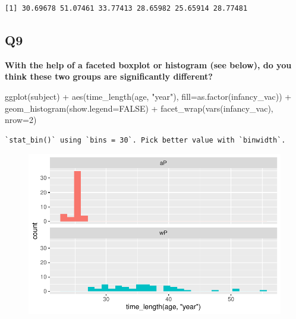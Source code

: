 \documentclass[
  letterpaper,
  DIV=11,
  numbers=noendperiod]{scrartcl}
\newenvironment{Shaded}{\begin{snugshade}}{\end{snugshade}}
\newcommand{\AttributeTok}[1]{\textcolor[rgb]{0.40,0.45,0.13}{#1}}
\newcommand{\ConstantTok}[1]{\textcolor[rgb]{0.56,0.35,0.01}{#1}}
\newcommand{\DecValTok}[1]{\textcolor[rgb]{0.68,0.00,0.00}{#1}}
\newcommand{\FunctionTok}[1]{\textcolor[rgb]{0.28,0.35,0.67}{#1}}
\newcommand{\NormalTok}[1]{\textcolor[rgb]{0.00,0.23,0.31}{#1}}
\newcommand{\SpecialCharTok}[1]{\textcolor[rgb]{0.37,0.37,0.37}{#1}}
\newcommand{\StringTok}[1]{\textcolor[rgb]{0.13,0.47,0.30}{#1}}
\begin{document}
\begin{verbatim}
[1] 30.69678 51.07461 33.77413 28.65982 25.65914 28.77481
\end{verbatim}

\hypertarget{q9}{%
\subsection{Q9}\label{q9}}

\textbf{With the help of a faceted boxplot or histogram (see below), do
you think these two groups are significantly different?}

\begin{Shaded}
\begin{Highlighting}[]
\FunctionTok{ggplot}\NormalTok{(subject) }\SpecialCharTok{+}
  \FunctionTok{aes}\NormalTok{(}\FunctionTok{time\_length}\NormalTok{(age, }\StringTok{"year"}\NormalTok{),}
      \AttributeTok{fill=}\FunctionTok{as.factor}\NormalTok{(infancy\_vac)) }\SpecialCharTok{+}
  \FunctionTok{geom\_histogram}\NormalTok{(}\AttributeTok{show.legend=}\ConstantTok{FALSE}\NormalTok{) }\SpecialCharTok{+}
  \FunctionTok{facet\_wrap}\NormalTok{(}\FunctionTok{vars}\NormalTok{(infancy\_vac), }\AttributeTok{nrow=}\DecValTok{2}\NormalTok{) }
\end{Highlighting}
\end{Shaded}

\begin{verbatim}
`stat_bin()` using `bins = 30`. Pick better value with `binwidth`.
\end{verbatim}

\begin{figure}[H]

{\centering \includegraphics{Class19_files/figure-pdf/unnamed-chunk-15-1.pdf}

}

\end{figure}
\end{document}
